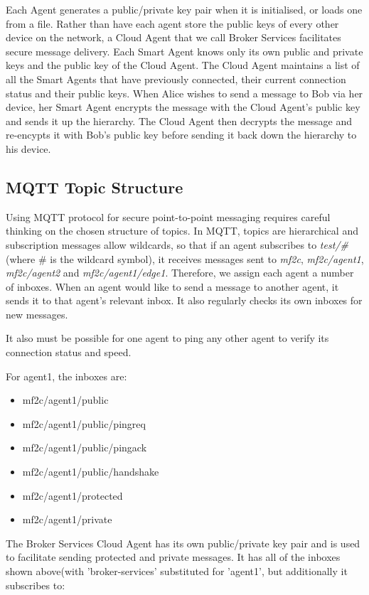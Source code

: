 \documentclass{article}
\begin{document}
Each Agent generates a public/private key pair when it is initialised, or loads one from a file. Rather than have each agent store the public keys of every other device on the network, a Cloud Agent that we call Broker Services facilitates secure message delivery. Each Smart Agent knows only its own public and private keys and the public key of the Cloud Agent. The Cloud Agent maintains a list of all the Smart Agents that have previously connected, their current connection status and their public keys. When Alice wishes to send a message to Bob via her device, her Smart Agent encrypts the message with the Cloud Agent's public key and sends it up the hierarchy. The Cloud Agent then decrypts the message and re-encypts it with Bob's public key before sending it back down the hierarchy to his device.  



\subsection{MQTT Topic Structure}


Using MQTT protocol for secure point-to-point messaging requires careful thinking on the chosen structure of topics. In MQTT, topics are hierarchical and subscription messages allow wildcards, so that if an agent subscribes to \textit{test/\#} (where \# is the wildcard symbol), it receives messages sent to \textit{mf2c}, \textit{mf2c/agent1}, \textit{mf2c/agent2} and \textit{mf2c/agent1/edge1}. Therefore, we assign each agent a number of inboxes. When an agent would like to send a message to another agent, it sends it to that agent's relevant inbox. It also regularly checks its own inboxes for new messages.

It also must be possible for one agent to ping any other agent to verify its connection status and speed.

For agent1, the inboxes are:
\begin{itemize}
    \item mf2c/agent1/public
    \item mf2c/agent1/public/pingreq
    \item mf2c/agent1/public/pingack
    \item mf2c/agent1/public/handshake
    \item mf2c/agent1/protected
    \item mf2c/agent1/private
\end{itemize}

The Broker Services Cloud Agent has its own public/private key pair and is used to facilitate sending protected and private messages. It has all of the inboxes shown above(with 'broker-services' substituted for 'agent1', but additionally it subscribes to:
\end{document}
